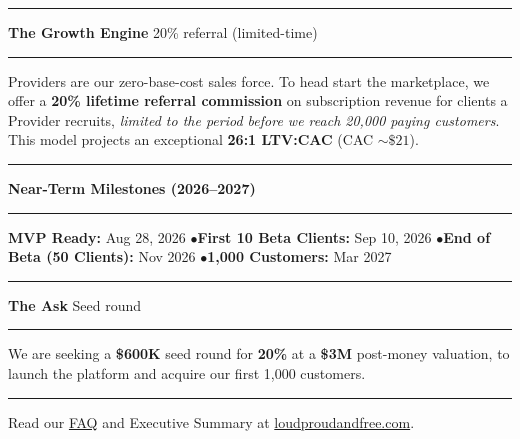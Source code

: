 \documentclass[8pt]{article}
\newcommand{\faqurl}{https://loudproudandfree.com}
\begin{document}
\vspace{0.2cm}

{\color{accent}\hrule}
\vspace{0.2cm}
{\Large\textbf{The Growth Engine}} \hfill {\small 20\% referral (limited-time)}
\vspace{0.2cm}
{\color{accent}\hrule}
\vspace{0.22cm}

\noindent Providers are our zero-base-cost sales force. To head start the marketplace, we offer a \textbf{20\% lifetime referral commission} on subscription revenue for clients a Provider recruits, \emph{limited to the period before we reach 20,000 paying customers}. This model projects an exceptional \textbf{\~26:1 LTV:CAC} (CAC $\sim\$21$).

\vspace{0.28cm}

{\color{accent}\hrule}
\vspace{0.2cm}
{\Large\textbf{Near-Term Milestones (2026--2027)}}
\vspace{0.2cm}
{\color{accent}\hrule}
\vspace{0.22cm}

\noindent \textbf{MVP Ready:} Aug 28, 2026 \quad$\bullet$\quad \textbf{First 10 Beta Clients:} Sep 10, 2026 \quad$\bullet$\quad \textbf{End of Beta (50 Clients):} Nov 2026 \quad$\bullet$\quad \textbf{1,000 Customers:} Mar 2027

\vspace{0.2cm}

{\color{accent}\hrule}
\vspace{0.2cm}
{\Large\textbf{The Ask}} \hfill {\small Seed round}
\vspace{0.2cm}
{\color{accent}\hrule}
\vspace{0.22cm}

\noindent We are seeking a \textbf{\$600K} seed round for \textbf{20\%} at a \textbf{\$3M} post-money valuation, to launch the platform and acquire our first 1,000 customers.

\vspace{0.28cm}
{\color{accent}\rule{\linewidth}{0.5mm}}
\begin{center}
Read our \href{\faqurl}{FAQ} and Executive Summary at \href{https://loudproudandfree.com}{loudproudandfree.com}.
\end{center}
\end{document}
